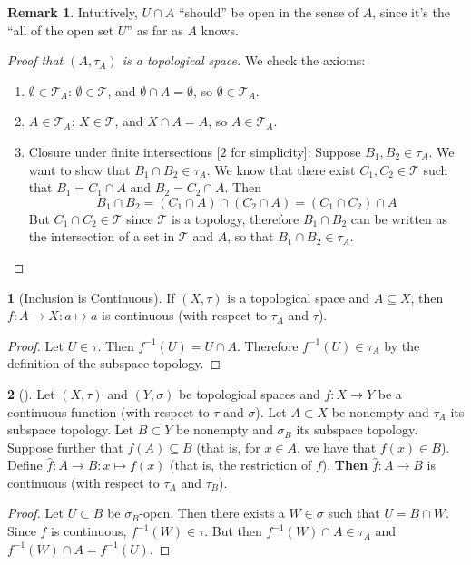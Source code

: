 \documentclass[11pt]{article}
\numberwithin{equation}{section}
\newcounter{theo}[section]\setcounter{theo}{0}
\theoremstyle{definition}
\newtheorem{claim}{\color{ForestGreen}{\textbf{Claim}}}[section]
\theoremstyle{definition}
\newtheorem*{remark}{Remark}
\newcommand\inv[1]{#1^{-1}}
\def\ss{\subset}
\def\sse{\subseteq}
\newcommand{\1}{\mathbbm 1}
\def\t{\tau}
\newcommand{\tT}{\mathcal T}
\begin{document}
\begin{remark}
	Intuitively, $U \cap A$ ``should'' be open in the sense of $A$, since it's the ``all of the open set $U$'' as far as $A$ knows. 
\end{remark}


\begin{proof}[Proof that $(A, \t_A)$ is a topological space]
	We check the axioms:
	\begin{enumerate}
		\item $\emptyset \in \tT_A$: $\emptyset \in \tT$, and $\emptyset \cap A = \emptyset$, so $\emptyset \in \tT_A$. 
		\item $A \in \tT_A$: $X \in \tT$, and $X \cap A = A$, so $A \in \tT_A$.  
		\item Closure under finite intersections [$2$ for simplicity]: Suppose $B_1, B_2 \in \t_A$. We want to show that $B_1 \cap B_2 \in \t_A$. We know that there exist $C_1, C_2 \in \tT$ such that $B_1 = C_1 \cap A$ and $B_2 = C_2 \cap A$. Then
		\begin{equation}
			B_1 \cap B_2 = (C_1 \cap A) \cap (C_2 \cap A) = (C_1 \cap C_2) \cap A
		\end{equation}
		But $C_1 \cap C_2 \in \tT$ since $\tT$ is a topology, therefore $B_1 \cap B_2$ can be written as the intersection of a set in $\tT$ and $A$, so that $B_1 \cap B_2 \in \t_A$. 
	\end{enumerate}
\end{proof}

\begin{claim}[Inclusion is Continuous]
	If $(X,\t)$ is a topological space and $A \sse X$, then $f:A \to X:a \mapsto a$ is continuous (with respect to $\t_A$ and $\tau$).
\end{claim}
\begin{proof}
	Let $U \in \t$. Then $\inv{f}(U) = U \cap A$. Therefore $\inv{f}(U) \in \t_A$ by the definition of the subspace topology. 
\end{proof}

\begin{claim}[]
	Let $(X,\t)$ and $(Y,\sigma)$ be topological spaces and $f: X\to Y$ be a continuous function (with respect to $\t$ and $\sigma$). Let $A \ss X$ be nonempty and $\t_A$ its subspace topology. Let $B \ss Y$ be nonempty and $\sigma_B$ its subspace topology. Suppose further that $f(A) \sse B$ (that is, for $x \in A$, we have that $f(x) \in B$). Define $\hat f: A\to B: x \mapsto f(x)$ (that is, the restriction of $f$). \textbf{Then} $\hat f: A \to B$ is continuous (with respect to $\t_A$ and $\t_B$). 
\end{claim}
\begin{proof}
	Let $U \ss B$ be $\sigma_B$-open. Then there exists a $W \in \sigma$ such that $U = B \cap W$. Since $f$ is continuous, $\inv{f}(W) \in \t$.  But then $\inv{f}(W) \cap A \in \t_A$ and $\inv{f}(W) \cap A = \inv{f}(U)$. 

\end{proof}
\end{document}
